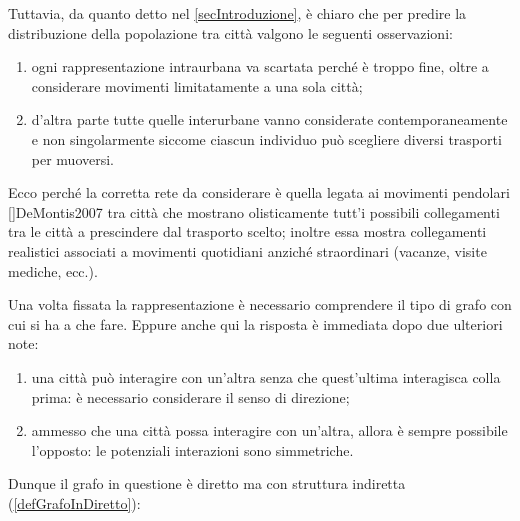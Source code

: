     Tuttavia, da quanto detto nel \cref{secIntroduzione}, è chiaro che per predire la distribuzione della popolazione tra città valgono le seguenti osservazioni:

    \begin{enumerate}[
      label=\arabic*.,
    ]
      \item ogni rappresentazione intraurbana va scartata perché è troppo fine, oltre a considerare movimenti limitatamente a una sola città;
      \item d'altra parte tutte quelle interurbane vanno considerate contemporaneamente e non singolarmente siccome ciascun individuo può scegliere diversi trasporti per muoversi.
    \end{enumerate}

    Ecco perché la corretta rete da considerare è quella legata ai movimenti pendolari []{DeMontis2007} tra città che mostrano olisticamente tutt'i possibili collegamenti tra le città a prescindere dal trasporto scelto; inoltre essa mostra collegamenti realistici associati a movimenti quotidiani anziché straordinari (vacanze, visite mediche, ecc.).

    Una volta fissata la rappresentazione è necessario comprendere il tipo di grafo con cui si ha a che fare. Eppure anche qui la risposta è immediata dopo due ulteriori note:
    
    \begin{enumerate}[
      label=\arabic*.,
    ]
      \item una città può interagire con un'altra senza che quest'ultima interagisca colla prima: è necessario considerare il senso di direzione;
      \item ammesso che una città possa interagire con un'altra, allora è sempre possibile l'opposto: le potenziali interazioni sono simmetriche.
    \end{enumerate}
  
    Dunque il grafo in questione è diretto ma con struttura indiretta (\cref{defGrafoInDiretto}):

